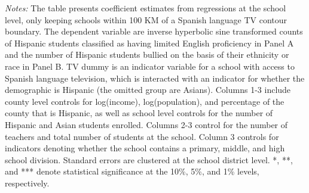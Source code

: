 \begin{table}[!htbp]
{\begin{threeparttable}
\begin{tablenotes}[flushleft]
				\item \textit{Notes:} The table presents coefficient estimates from regressions at the school level, only keeping schools within 100 KM of a Spanish language TV contour boundary. The dependent variable are inverse hyperbolic sine transformed counts of Hispanic students classified as having limited English proficiency in Panel A and the number of Hispanic students bullied on the basis of their ethnicity or race in Panel B. TV dummy is an indicator variable for a school with access to Spanish language television, which is interacted with an indicator for whether the demographic is Hispanic (the omitted group are Asians). Columns 1-3 include county level controls for log(income), log(population), and percentage of the county that is Hispanic, as well as school level controls for the number of Hispanic and Asian students enrolled. Columns 2-3 control for the number of teachers and total number of students at the school. Column 3 controls for indicators denoting whether the school contains a primary, middle, and high school division. Standard errors are clustered at the school district level. *, **, and *** denote statistical significance at the 10\%, 5\%, and 1\% levels, respectively.
			\end{tablenotes}
		\end{threeparttable}
	}
\end{table}